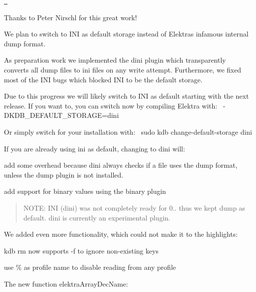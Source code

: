 \href{https://asciinema.org/a/153014}{\texttt{ }}

Thanks to Peter Nirschl for this great work!

We plan to switch to I\+NI as default storage instead of Elektra\textquotesingle{}s infamous internal dump format.

As preparation work we implemented the {\ttfamily dini} plugin which transparently converts all {\ttfamily dump} files to {\ttfamily ini} files on any write attempt. Furthermore, we fixed most of the I\+NI bugs which blocked I\+NI to be the default storage.

Due to this progress we will likely switch to I\+NI as default starting with the next release. If you want to, you can switch now by compiling Elektra with\+:~\newline
 {\ttfamily -\/D\+K\+D\+B\+\_\+\+D\+E\+F\+A\+U\+L\+T\+\_\+\+S\+T\+O\+R\+A\+GE=dini}

Or simply switch for your installation with\+:~\newline
 {\ttfamily sudo kdb change-\/default-\/storage dini}

If you are already using {\ttfamily ini} as default, changing to {\ttfamily dini} will\+:


\begin{DoxyItemize}
\item add some overhead because {\ttfamily dini} always checks if a file uses the {\ttfamily dump} format, unless the {\ttfamily dump} plugin is not installed.
\item add support for binary values using the {\ttfamily binary} plugin
\end{DoxyItemize}

\begin{quote}
N\+O\+TE\+: I\+NI (dini) was not completely ready for 0.. thus we kept {\ttfamily dump} as default. {\ttfamily dini} is currently an experimental plugin. \end{quote}


We added even more functionality, which could not make it to the highlights\+:


\begin{DoxyItemize}
\item {\ttfamily kdb rm} now supports {\ttfamily -\/f} to ignore non-\/existing keys
\item use {\ttfamily \%} as profile name to disable reading from any profile
\item The new function {\ttfamily elektra\+Array\+Dec\+Name}\+:
\end{DoxyItemize}


